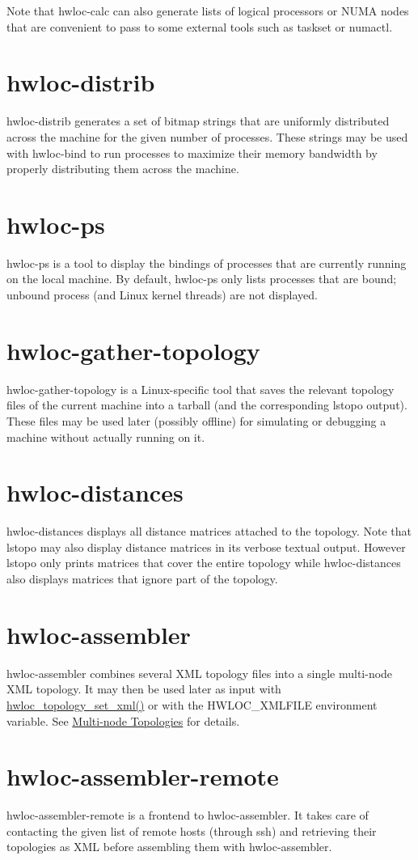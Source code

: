 Note that hwloc-\/calc can also generate lists of logical processors or NUMA nodes that are convenient to pass to some external tools such as taskset or numactl.\hypertarget{a00002_cli_hwloc_distrib}{}\section{hwloc-\/distrib}\label{a00002_cli_hwloc_distrib}
hwloc-\/distrib generates a set of bitmap strings that are uniformly distributed across the machine for the given number of processes. These strings may be used with hwloc-\/bind to run processes to maximize their memory bandwidth by properly distributing them across the machine.\hypertarget{a00002_cli_hwloc_ps}{}\section{hwloc-\/ps}\label{a00002_cli_hwloc_ps}
hwloc-\/ps is a tool to display the bindings of processes that are currently running on the local machine. By default, hwloc-\/ps only lists processes that are bound; unbound process (and Linux kernel threads) are not displayed.\hypertarget{a00002_cli_hwloc_gather}{}\section{hwloc-\/gather-\/topology}\label{a00002_cli_hwloc_gather}
hwloc-\/gather-\/topology is a Linux-\/specific tool that saves the relevant topology files of the current machine into a tarball (and the corresponding lstopo output). These files may be used later (possibly offline) for simulating or debugging a machine without actually running on it.\hypertarget{a00002_cli_hwloc_distances}{}\section{hwloc-\/distances}\label{a00002_cli_hwloc_distances}
hwloc-\/distances displays all distance matrices attached to the topology. Note that lstopo may also display distance matrices in its verbose textual output. However lstopo only prints matrices that cover the entire topology while hwloc-\/distances also displays matrices that ignore part of the topology.\hypertarget{a00002_cli_hwloc_assembler}{}\section{hwloc-\/assembler}\label{a00002_cli_hwloc_assembler}
hwloc-\/assembler combines several XML topology files into a single multi-\/node XML topology. It may then be used later as input with \hyperlink{a00044_ga93efcc8a962afe1ed23393700682173f}{hwloc\_\-topology\_\-set\_\-xml()} or with the HWLOC\_\-XMLFILE environment variable. See \hyperlink{a00006}{Multi-\/node Topologies} for details.\hypertarget{a00002_cli_hwloc_assembler_remote}{}\section{hwloc-\/assembler-\/remote}\label{a00002_cli_hwloc_assembler_remote}
hwloc-\/assembler-\/remote is a frontend to hwloc-\/assembler. It takes care of contacting the given list of remote hosts (through ssh) and retrieving their topologies as XML before assembling them with hwloc-\/assembler. 